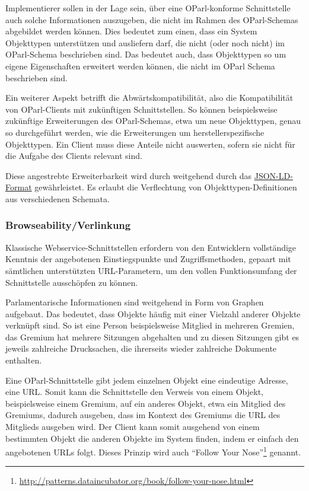 \documentclass[,a4paper]{article}
\begin{document}
Implementierer sollen in der Lage sein, über eine OParl-konforme
Schnittstelle auch solche Informationen auszugeben, die nicht im Rahmen
des OParl-Schemas abgebildet werden können. Dies bedeutet zum einen,
dass ein System Objekttypen unterstützen und ausliefern darf, die nicht
(oder noch nicht) im OParl-Schema beschrieben sind. Das bedeutet auch,
dass Objekttypen so um eigene Eigenschaften erweitert werden können, die
nicht im OParl Schema beschrieben sind.

Ein weiterer Aspekt betrifft die Abwärtskompatibilität, also die
Kompatibilität von OParl-Clients mit zukünftigen Schnittstellen. So
können beispielsweise zukünftige Erweiterungen des OParl-Schemas, etwa
um neue Objekttypen, genau so durchgeführt werden, wie die Erweiterungen
um herstellerspezifische Objekttypen. Ein Client muss diese Anteile
nicht auswerten, sofern sie nicht für die Aufgabe des Clients relevant
sind.

Diese angestrebte Erweiterbarkeit wird durch weitgehend durch das
\hyperref[jsonld]{JSON-LD-Format} gewährleistet. Es erlaubt die
Verflechtung von Objekttypen-Definitionen aus verschiedenen Schemata.

\subsubsection{Browseability/Verlinkung}\label{browseabilityux5fverlinkung}

Klassische Webservice-Schnittstellen erfordern von den Entwicklern
vollständige Kenntnis der angebotenen Einstiegspunkte und
Zugriffsmethoden, gepaart mit sämtlichen unterstützten URL-Parametern,
um den vollen Funktionsumfang der Schnittstelle ausschöpfen zu können.

Parlamentarische Informationen sind weitgehend in Form von Graphen
aufgebaut. Das bedeutet, dass Objekte häufig mit einer Vielzahl anderer
Objekte verknüpft sind. So ist eine Person beispielsweise Mitglied in
mehreren Gremien, das Gremium hat mehrere Sitzungen abgehalten und zu
diesen Sitzungen gibt es jeweils zahlreiche Drucksachen, die ihrerseits
wieder zahlreiche Dokumente enthalten.

Eine OParl-Schnittstelle gibt jedem einzelnen Objekt eine eindeutige
Adresse, eine URL. Somit kann die Schnittstelle den Verweis von einem
Objekt, beispielsweise einem Gremium, auf ein anderes Objekt, etwa ein
Mitglied des Gremiums, dadurch ausgeben, dass im Kontext des Gremiums
die URL des Mitglieds ausgeben wird. Der Client kann somit ausgehend von
einem bestimmten Objekt die anderen Objekte im System finden, indem er
einfach den angebotenen URLs folgt. Dieses Prinzip wird auch ``Follow
Your Nose''\footnote{\url{http://patterns.dataincubator.org/book/follow-your-nose.html}}
genannt.
\end{document}
